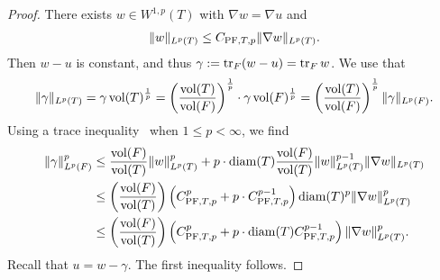 \documentclass[10pt,letterpaper]{article}
\begin{document}
\begin{proof}
    There exists $w \in W^{1,p}(T)$ with $\nabla w = \nabla u$ and 
    \begin{gather*}
        \| w \|_{L^{p}(T)}
        \leq 
        C_{{\rm PF},T,p} 
        \| \nabla w \|_{L^{p}(T)} %
        .
    \end{gather*}
    Then $w-u$ is constant, and thus $\gamma := \operatorname{tr}_{F} (w-u) = \operatorname{tr}_{F} w$. 
    We use that 
    \begin{gather*}
        \| \gamma \|_{L^{p}(T)}
        =
        \gamma \operatorname{vol}(T)^\frac{1}{p}
        =
        \left( \frac{ \operatorname{vol}(T) }{ \operatorname{vol}(F) } \right)^\frac{1}{p}
        \cdot 
        \gamma 
        \operatorname{vol}(F)^\frac{1}{p}
        =
        \left( \frac{ \operatorname{vol}(T) }{ \operatorname{vol}(F) } \right)^\frac{1}{p}
        \| \gamma \|_{L^{p}(F)}
        .
    \end{gather*}
    Using a trace inequality~\cite[Lemma~2.8]{veeser2012poincare} when $1 \leq p < \infty$, we find 
    \begin{align*}
        \| \gamma \|_{L^{p}(F)}^{p}
        &
        \leq 
        \frac{ \operatorname{vol}(F) }{ \operatorname{vol}(T) }
        \| w \|_{L^{p}(T)}^{p}
        +
        p
        \cdot 
        {\operatorname{diam}}(T)
        \frac{ \operatorname{vol}(F) }{ \operatorname{vol}(T) }
        \| w \|_{L^{p}(T)}^{p-1}
        \| \nabla w \|_{L^{p}(T)}
        \\&
        \leq 
        \left( \frac{ \operatorname{vol}(F) }{ \operatorname{vol}(T) } \right)
        \left( C_{{\rm PF},T,p}^{p} + p \cdot C_{{\rm PF},T,p}^{p-1} \right) 
        {\operatorname{diam}}(T)^{p}
        \| \nabla w \|_{L^{p}(T)}^{p}
        \\&
        \leq 
        \left( \frac{ \operatorname{vol}(F) }{ \operatorname{vol}(T) } \right)
        \left( C_{{\rm PF},T,p}^{p} + p \cdot {\operatorname{diam}}(T) C_{{\rm PF},T,p}^{p-1} \right) 
        \| \nabla w \|_{L^{p}(T)}^{p}
        .
    \end{align*}
    Recall that $u = w - \gamma$. The first inequality follows. 
    

\end{proof}
\end{document}
